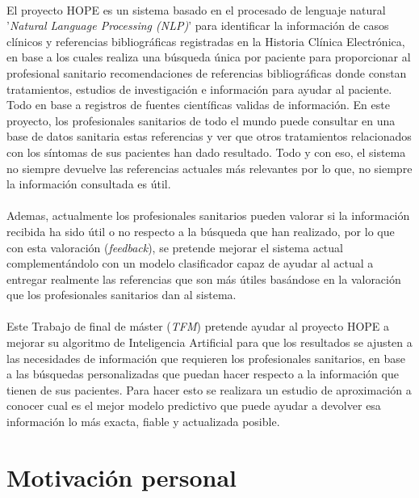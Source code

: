 \paragraph{}
El proyecto HOPE es un sistema basado en el procesado de lenguaje natural '\textit{Natural Language Processing (NLP)}' para identificar la información de casos clínicos y referencias bibliográficas registradas en la Historia Clínica Electrónica, en base a los cuales realiza una búsqueda única por paciente para proporcionar al profesional sanitario recomendaciones de referencias bibliográficas donde constan tratamientos, estudios de investigación e información para ayudar al paciente. Todo en base a registros de fuentes científicas validas de información. En este proyecto, los profesionales sanitarios de todo el mundo puede consultar en una base de datos sanitaria estas referencias y ver que otros tratamientos relacionados con los síntomas de sus pacientes han dado resultado. Todo y con eso, el sistema no siempre devuelve las referencias actuales más relevantes por lo que, no siempre la información consultada es útil\cite{ref:pfm_karla}.

\paragraph{}
Ademas, actualmente los profesionales sanitarios pueden valorar si la información recibida ha sido útil o no respecto a la búsqueda que han realizado, por lo que con esta valoración (\textit{feedback}), se pretende mejorar el sistema actual complementándolo con un modelo clasificador capaz de ayudar al actual a entregar realmente las referencias que son más útiles basándose en la valoración que los profesionales sanitarios dan al sistema.

\paragraph{}
Este Trabajo de final de máster (\textit{TFM}) pretende ayudar al proyecto HOPE a mejorar su algoritmo de Inteligencia Artificial para que los resultados se ajusten a las necesidades de información que requieren los profesionales sanitarios, en base a las búsquedas personalizadas que puedan hacer respecto a la información que tienen de sus pacientes. Para hacer esto se realizara un estudio de aproximación a conocer cual es el mejor modelo predictivo que puede ayudar a devolver esa información lo más exacta, fiable y actualizada posible.

\section{Motivación personal}

